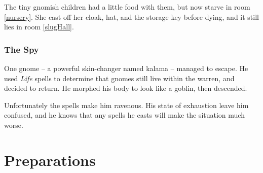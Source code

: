 \begin{multicols}{2}
\begin{exampletext}
  The tiny gnomish children had a little food with them, but now starve in room \ref{nursery}.
  She cast off her cloak, hat, and the storage key before dying, and it still lies in room \ref{slugHall}.
\end{exampletext}

\subsubsection{The Spy}
\label{kalama}

\begin{exampletext}
  One gnome -- a powerful skin-changer named \gls{kalama} -- managed to escape.
  He used \textit{Life} spells to determine that gnomes still live within the \gls{warren}, and decided to return.
  He morphed his body to look like a goblin, then descended.

  Unfortunately the spells make him ravenous.
  His state of exhaustion leave him confused, and he knows that any spells he casts will make the situation much worse.
\end{exampletext}

\end{multicols}

\section{Preparations}

